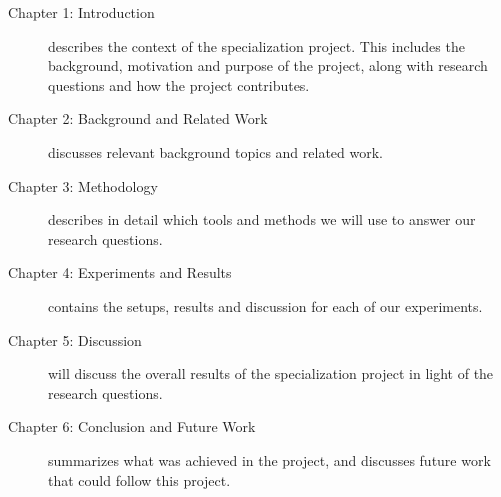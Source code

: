 \begin{description}
    \item[Chapter 1: Introduction] describes the context of the specialization project. This includes the background, motivation and purpose of the project, along with research questions and how the project contributes.
    \item[Chapter 2: Background and Related Work] discusses relevant background topics and related work.
    \item[Chapter 3: Methodology] describes in detail which tools and methods we will use to answer our research questions.
    \item[Chapter 4: Experiments and Results] contains the setups, results and discussion for each of our experiments.
    \item[Chapter 5: Discussion] will discuss the overall results of the specialization project in light of the research questions.
    \item[Chapter 6: Conclusion and Future Work] summarizes what was achieved in the project, and discusses future work that could follow this project.
\end{description}

